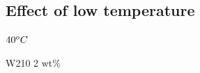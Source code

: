 \documentclass[numbers=noendperiod,chapterprefix=on]{icldt} %
\begin{document}
{%
%
%
%
%
%
%
%
%
%
%
%
%
%
%

\subsection{Effect of low temperature}

$\-40 ^oC$

W210 2 wt\%

}
\end{document}
